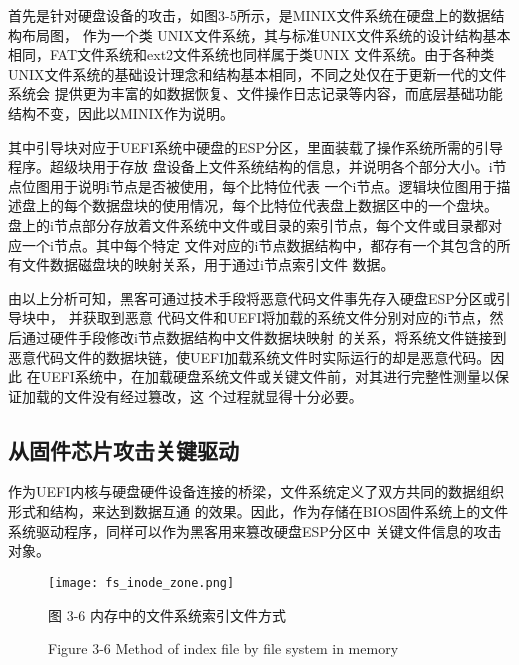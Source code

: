 \par 首先是针对硬盘设备的攻击，如图3-5所示，是MINIX文件系统在硬盘上的数据结构布局图\cite{chinese30}，
作为一个类
UNIX文件系统，其与标准UNIX文件系统的设计结构基本相同，FAT文件系统和ext2文件系统也同样属于类UNIX
文件系统。由于各种类UNIX文件系统的基础设计理念和结构基本相同，不同之处仅在于更新一代的文件系统会
提供更为丰富的如数据恢复、文件操作日志记录等内容，而底层基础功能结构不变，因此以MINIX作为说明\cite{chinese31}。
\par 其中引导块对应于UEFI系统中硬盘的ESP分区，里面装载了操作系统所需的引导程序。超级块用于存放
盘设备上文件系统结构的信息，并说明各个部分大小。i节点位图用于说明i节点是否被使用，每个比特位代表
一个i节点。逻辑块位图用于描述盘上的每个数据盘块的使用情况，每个比特位代表盘上数据区中的一个盘块。
盘上的i节点部分存放着文件系统中文件或目录的索引节点，每个文件或目录都对应一个i节点。其中每个特定
文件对应的i节点数据结构中，都存有一个其包含的所有文件数据磁盘块的映射关系，用于通过i节点索引文件
数据。
\par 由以上分析可知，黑客可通过技术手段将恶意代码文件事先存入硬盘ESP分区或引导块中\cite{chinese32}，
并获取到恶意
代码文件和UEFI将加载的系统文件分别对应的i节点，然后通过硬件手段修改i节点数据结构中文件数据块映射
的关系，将系统文件链接到恶意代码文件的数据块链，使UEFI加载系统文件时实际运行的却是恶意代码。因此
在UEFI系统中，在加载硬盘系统文件或关键文件前，对其进行完整性测量以保证加载的文件没有经过篡改，这
个过程就显得十分必要。

\subsection{从固件芯片攻击关键驱动}
作为UEFI内核与硬盘硬件设备连接的桥梁，文件系统定义了双方共同的数据组织形式和结构，来达到数据互通
的效果。因此，作为存储在BIOS固件系统上的文件系统驱动程序，同样可以作为黑客用来篡改硬盘ESP分区中
关键文件信息的攻击对象。

\begin{figure}[htb]
    \vspace{0cm}   
    \setlength{\abovecaptionskip}{0.3cm}  
	\centering
    \texttt{[image: fs\_inode\_zone.png]}
    \caption*{图 3-6 内存中的文件系统索引文件方式}
    \setlength{\belowcaptionskip}{-0.7cm}
    \caption*{Figure 3-6 Method of index file by file system in memory}
\end{figure}

